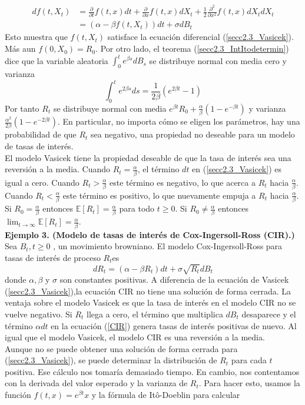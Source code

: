 \documentclass[11pt,notitlepage]{article}
\begin{document}
\begin{align*}
    df(t,X_{t})&=\frac{\partial}{\partial t}f(t,x)dt+\frac{\partial}{\partial x}f(t,x)dX_{t}+\frac{1}{2}\frac{\partial^2}{\partial x^2}f(t,x)dX_{t}dX_{t}\\
    &=\left ( \alpha-\beta f(t,X_{t}) \right )dt+\sigma dB_{t}
\end{align*}
Esto muestra que $f(t,X_{t})$ satisface la ecuación diferencial (\ref{secc2.3_Vasicek}). Más aun $f(0,X_{0})=R_0$. Por otro lado, el teorema (\ref{secc2.3_IntItodetermin}) dice que la variable aleatoria $\int_{0}^{t}e^{\beta s} dB_{s}$ se distribuye normal con media cero y varianza
\begin{equation*}
    \int_{0}^{t}e^{2 \beta s} ds=\frac{1}{2\beta}(e^{2 \beta t}-1)
\end{equation*}
Por tanto $R_{t}$ se distribuye normal con media $e^{\beta t}R_0 +\frac{\alpha}{\beta}(1-e^{-\beta t})$ y varianza $\frac{\alpha^2}{2 \beta}(1-e^{-2 \beta t})$. En particular, no importa cómo se eligen los parámetros, hay una probabilidad de que $R_{t}$ sea negativo, una propiedad no deseable para un modelo de tasas de interés.\\
El modelo Vasicek tiene la propiedad deseable de que la tasa de interés sea una
reversión a la media. Cuando $R_{t} = \frac{\alpha}{\beta}$, el término  \(dt\) en (\ref{secc2.3_Vasicek}) es igual a cero. Cuando $ R_t>\frac{\alpha}{\beta} $ este término es negativo, lo que acerca a $R_t$ hacia  $\frac{\alpha}{\beta}$. Cuando  $R_t<\frac{\alpha}{\beta}$ este término es positivo, lo que nuevamente empuja a $R_t$ hacia  $\frac{\alpha}{\beta}$. Si $R_0 = \frac{\alpha}{\beta}$ entonces $\mathbb{E}[R_t]=\frac{\alpha}{\beta}$ para todo $t \geq 0$. Si $R_0 \neq \frac{\alpha}{\beta}$ entonces $\lim_{t \rightarrow \infty} \mathbb{E}[R_t]=\frac{\alpha}{\beta}$.\\ 

\textbf{Ejemplo 3. (Modelo de tasas de interés de Cox-Ingersoll-Ross (CIR).)}
Sea $B_t,t \geq 0$ , un movimiento browniano. El modelo Cox-Ingersoll-Ross para tasas de interés de proceso $R_t$es
\begin{equation}\label{CIR}
    dR_t=(\alpha- \beta R_t) dt+ \sigma \sqrt{R_t}dB_t
\end{equation}
donde $\alpha, \beta $ y $\sigma$ son constantes positivas. A diferencia de la ecuación de Vasicek (\ref{secc2.3_Vasicek}),la ecuación CIR  no tiene una solución de forma cerrada. La ventaja sobre el modelo Vasicek es que la tasa de interés en el modelo CIR no se vuelve negativo. Si $R_t$ llega a cero, el término que multiplica $dB_t$ desaparece y el término $ \alpha dt$ en la ecuación (\ref{CIR}) genera tasas de interés positivas de nuevo. Al igual que el modelo Vasicek, el modelo CIR es una reversión a la media.\\
Aunque no se puede obtener una solución de forma cerrada para (\ref{secc2.3_Vasicek}), se puede determinar la distribución de $R_t$ para cada $t$ positiva. Ese cálculo nos tomaría demasiado tiempo. En cambio, nos contentamos con la derivada del valor esperado y la varianza de $ R_t$. Para hacer esto, usamos la función $f (t, x) = e^{\beta t}x$ y la fórmula de Itô-Doeblin para calcular
\end{document}
